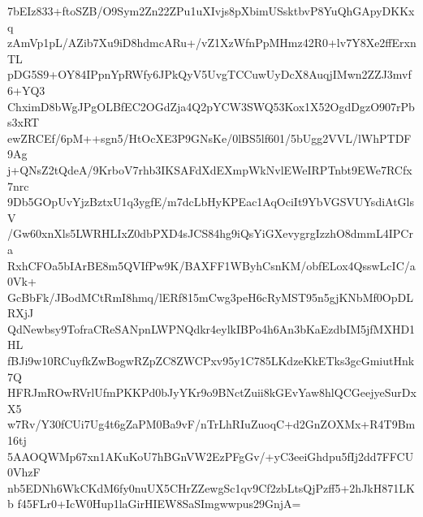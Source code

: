 7bEIz833+ftoSZB/O9Sym2Zn22ZPu1uXIvjs8pXbimUSsktbvP8YuQhGApyDKKxq
zAmVp1pL/AZib7Xu9iD8hdmcARu+/vZ1XzWfnPpMHmz42R0+lv7Y8Xe2ffErxnTL
pDG5S9+OY84IPpnYpRWfy6JPkQyV5UvgTCCuwUyDcX8AuqjIMwn2ZZJ3mvf6+YQ3
ChximD8bWgJPgOLBfEC2OGdZja4Q2pYCW3SWQ53Kox1X52OgdDgzO907rPbs3xRT
ewZRCEf/6pM++sgn5/HtOcXE3P9GNsKe/0lBS5lf601/5bUgg2VVL/lWhPTDF9Ag
j+QNsZ2tQdeA/9KrboV7rhb3IKSAFdXdEXmpWkNvlEWeIRPTnbt9EWe7RCfx7nrc
9Db5GOpUvYjzBztxU1q3ygfE/m7dcLbHyKPEac1AqOciIt9YbVGSVUYsdiAtGlsV
/Gw60xnXls5LWRHLIxZ0dbPXD4sJCS84hg9iQsYiGXevygrgIzzhO8dmmL4IPCra
RxhCFOa5bIArBE8m5QVIfPw9K/BAXFF1WByhCsnKM/obfELox4QsswLcIC/a0Vk+
GcBbFk/JBodMCtRmI8hmq/lERf815mCwg3peH6cRyMST95n5gjKNbMf0OpDLRXjJ
QdNewbsy9TofraCReSANpnLWPNQdkr4eylkIBPo4h6An3bKaEzdbIM5jfMXHD1HL
fBJi9w10RCuyfkZwBogwRZpZC8ZWCPxv95y1C785LKdzeKkETks3gcGmiutHnk7Q
HFRJmROwRVrlUfmPKKPd0bJyYKr9o9BNctZuii8kGEvYaw8hlQCGeejyeSurDxX5
w7Rv/Y30fCUi7Ug4t6gZaPM0Ba9vF/nTrLhRIuZuoqC+d2GnZOXMx+R4T9Bm16tj
5AAOQWMp67xn1AKuKoU7hBGnVW2EzPFgGv/+yC3eeiGhdpu5fIj2dd7FFCU0VhzF
nb5EDNh6WkCKdM6fy0nuUX5CHrZZewgSc1qv9Cf2zbLtsQjPzff5+2hJkH871LKb
f45FLr0+IcW0Hup1laGirHIEW8SaSImgwwpus29GnjA=
